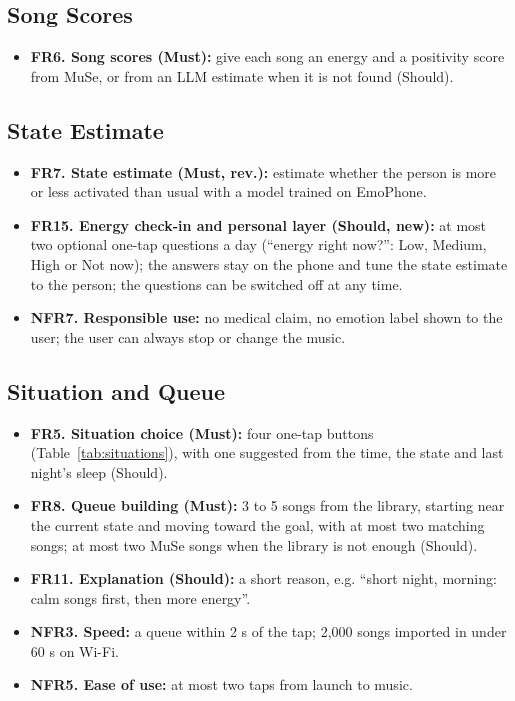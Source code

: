 \documentclass[conference]{IEEEtran}
\begin{document}
\subsection{Song Scores}
\begin{itemize}
\item \textbf{FR6. Song scores (Must):} give each song an energy and a positivity score from MuSe, or from an LLM estimate when it is not found (Should).
\end{itemize}

\subsection{State Estimate}
\begin{itemize}
\item \textbf{FR7. State estimate (Must, rev.):} estimate whether the person is more or less activated than usual with a model trained on EmoPhone.
\item \textbf{FR15. Energy check-in and personal layer (Should, new):} at most two optional one-tap questions a day (``energy right now?'': Low, Medium, High or Not now); the answers stay on the phone and tune the state estimate to the person; the questions can be switched off at any time.
\item \textbf{NFR7. Responsible use:} no medical claim, no emotion label shown to the user; the user can always stop or change the music.
\end{itemize}

\subsection{Situation and Queue}
\begin{itemize}
\item \textbf{FR5. Situation choice (Must):} four one-tap buttons (Table~\ref{tab:situations}), with one suggested from the time, the state and last night's sleep (Should).
\item \textbf{FR8. Queue building (Must):} 3 to 5 songs from the library, starting near the current state and moving toward the goal, with at most two matching songs; at most two MuSe songs when the library is not enough (Should).
\item \textbf{FR11. Explanation (Should):} a short reason, e.g. ``short night, morning: calm songs first, then more energy''.
\item \textbf{NFR3. Speed:} a queue within 2 s of the tap; 2,000 songs imported in under 60 s on Wi-Fi.
\item \textbf{NFR5. Ease of use:} at most two taps from launch to music.
\end{itemize}
\end{document}
